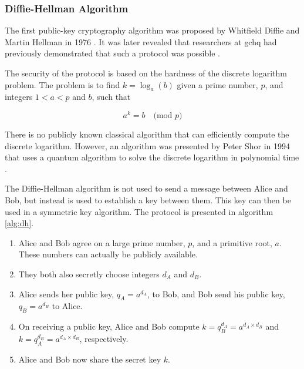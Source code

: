 

\subsubsection*{Diffie-Hellman Algorithm}

The first public-key cryptography algorithm was proposed by Whitfield Diffie and Martin Hellman in 1976 \cite{diffie1976new}. It was later revealed that researchers at \ac{gchq} had previously demonstrated that such a protocol was possible \cite{Ellis1970, williamson1974}.

The security of the protocol is based on the hardness of the discrete logarithm problem. The problem is to find $k = \log_a(b)$ given a prime number, $p$, and integers $1<a<p$ and $b$, such that

\begin{equation}
	a^k = b\quad\text{(mod } p\text{)}
\end{equation}

There is no publicly known classical algorithm that can efficiently compute the discrete logarithm. However, an algorithm was presented by Peter Shor in 1994 that uses a quantum algorithm to solve the discrete logarithm in polynomial time \cite{shor1994}.

The Diffie-Hellman algorithm is not used to send a message between Alice and Bob, but instead is used to establish a key between them. This key can then be used in a symmetric key algorithm. The protocol is presented in algorithm \ref{alg:dh}.

\begin{algorithm}
\label{alg:dh}
\begin{enumerate}
	\item Alice and Bob agree on a large prime number, $p$, and a primitive root, $a$. These numbers can actually be publicly available.
	\item They both also secretly choose integers $d_A$ and $d_B$.
	\item Alice sends her public key, $q_A = a^{d_A}$, to Bob, and Bob send his public key, $q_B = a^{d_B}$ to Alice.
	\item On receiving a public key, Alice and Bob compute $k = q_B^{d_A} = a^{d_A\times d_B}$ and $k = q_A^{d_B} = a^{d_A\times d_B}$, respectively.
	\item Alice and Bob now share the secret key $k$.
\end{enumerate}
\end{algorithm}

